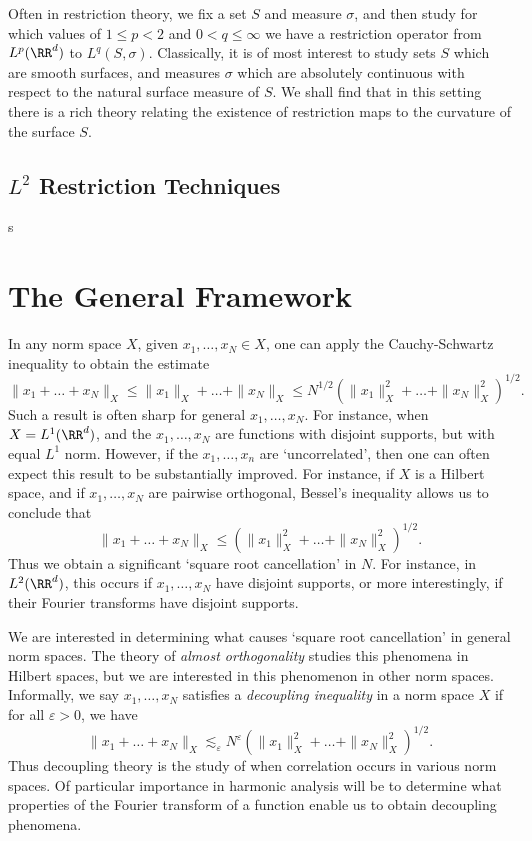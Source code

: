 Often in restriction theory, we fix a set $S$ and measure $\sigma$, and then study for which values of $1 \leq p < 2$ and $0 < q \leq \infty$ we have a restriction operator from $L^p(\RR^d)$ to $L^q(S,\sigma)$. Classically, it is of most interest to study sets $S$ which are smooth surfaces, and measures $\sigma$ which are absolutely continuous with respect to the natural surface measure of $S$. We shall find that in this setting there is a rich theory relating the existence of restriction maps to the curvature of the surface $S$.

\section{$L^2$ Restriction Techniques}

s








\chapter{The General Framework}

In any norm space $X$, given $x_1, \dots, x_N \in X$, one can apply the Cauchy-Schwartz inequality to obtain the estimate
%
\[ \| x_1 + \dots + x_N \|_X \leq \| x_1 \|_X + \dots + \| x_N \|_X \leq N^{1/2} \left( \| x_1 \|_X^2 + \dots + \| x_N \|_X^2 \right)^{1/2}. \]
%
Such a result is often sharp for general $x_1, \dots, x_N$. For instance, when $X = L^1(\RR^d)$, and the $x_1, \dots, x_N$ are functions with disjoint supports, but with equal $L^1$ norm. However, if the $x_1, \dots, x_n$ are `uncorrelated', then one can often expect this result to be substantially improved. For instance, if $X$ is a Hilbert space, and if $x_1, \dots, x_N$ are pairwise orthogonal, Bessel's inequality allows us to conclude that
%
\[ \| x_1 + \dots + x_N \|_X \leq \left( \| x_1 \|_X^2 + \dots + \| x_N \|_X^2 \right)^{1/2}. \]
%
Thus we obtain a significant `square root cancellation' in $N$. For instance, in $L^2(\RR^d)$, this occurs if $x_1, \dots, x_N$ have disjoint supports, or more interestingly, if their Fourier transforms have disjoint supports.

We are interested in determining what causes `square root cancellation' in general norm spaces. The theory of \emph{almost orthogonality} studies this phenomena in Hilbert spaces, but we are interested in this phenomenon in other norm spaces. Informally, we say $x_1, \dots, x_N$ satisfies a \emph{decoupling inequality} in a norm space $X$ if for all $\varepsilon > 0$, we have
%
\[ \| x_1 + \dots + x_N \|_X \lesssim_\varepsilon N^\varepsilon \left( \| x_1 \|_X^2 + \dots + \| x_N \|_X^2 \right)^{1/2}. \]
%
Thus decoupling theory is the study of when correlation occurs in various norm spaces. Of particular importance in harmonic analysis will be to determine what properties of the Fourier transform of a function enable us to obtain decoupling phenomena.

